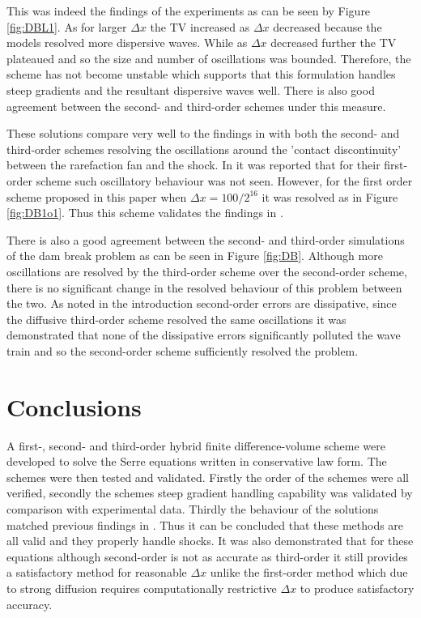 \documentclass[SingleSpace,12pt]{Serre_ASCE}
\begin{document}
This was indeed the findings of the experiments as can be seen by Figure \ref{fig:DBL1}. As for larger $\Delta x$ the TV increased as $\Delta x$ decreased because the models resolved more dispersive waves. While as $\Delta x$ decreased further the TV plateaued and so the size and number of oscillations was bounded. Therefore, the scheme has not become unstable which supports that this formulation handles steep gradients and the resultant dispersive waves well. There is also good agreement between the second- and third-order schemes under this measure. 

These solutions compare very well to the findings in \cite{El-etal-2006} with both the second- and third-order schemes resolving the oscillations around the 'contact discontinuity'\cite{El-etal-2006} between the rarefaction fan and the shock. In  it was reported that for their first-order scheme such oscillatory behaviour was not seen. However, for the first order scheme proposed in this paper when $\Delta x = 100 /2^{16}$ it was resolved as in Figure \ref{fig:DB1o1}. Thus this scheme validates the findings in .

There is also a good agreement between the second- and third-order simulations of the dam break problem as can be seen in Figure \ref{fig:DB}. Although more oscillations are resolved by the third-order scheme over the second-order scheme, there is no significant change in the resolved behaviour of this problem between the two. As noted in the introduction second-order errors are dissipative, since the diffusive third-order scheme resolved the same oscillations it was demonstrated that none of the dissipative errors significantly polluted the wave train and so the second-order scheme sufficiently resolved the problem.
\section{Conclusions}
\label{section:Conclusions}
A first-, second- and third-order hybrid finite difference-volume scheme were developed to solve the Serre equations written in conservative law form. The schemes were then tested and validated. Firstly the order of the schemes were all verified, secondly the schemes steep gradient handling capability was validated by comparison with experimental data. Thirdly the behaviour of the solutions matched previous findings in . Thus it can be concluded that these methods are all valid and they properly handle shocks. It was also demonstrated that for these equations although second-order is not as accurate as third-order it still provides a satisfactory method for reasonable $\Delta x$ unlike the first-order method which due to strong diffusion requires computationally restrictive $\Delta x$ to produce satisfactory accuracy.
\end{document}
